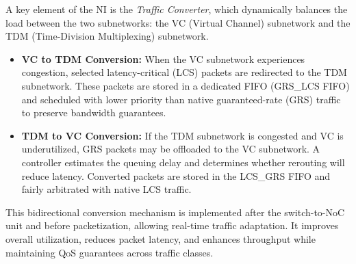 A key element of the NI is the \textit{Traffic Converter}, which dynamically balances the load between the two subnetworks: the VC (Virtual Channel) subnetwork and the TDM (Time-Division Multiplexing) subnetwork.
\begin{itemize}
    \item \textbf{VC to TDM Conversion:} When the VC subnetwork experiences congestion, selected latency-critical (LCS) packets are redirected to the TDM subnetwork. These packets are stored in a dedicated FIFO (GRS\_LCS FIFO) and scheduled with lower priority than native guaranteed-rate (GRS) traffic to preserve bandwidth guarantees.
    \item \textbf{TDM to VC Conversion:} If the TDM subnetwork is congested and VC is underutilized, GRS packets may be offloaded to the VC subnetwork. A controller estimates the queuing delay and determines whether rerouting will reduce latency. Converted packets are stored in the LCS\_GRS FIFO and fairly arbitrated with native LCS traffic.
\end{itemize}
This bidirectional conversion mechanism is implemented after the switch-to-NoC unit and before packetization, allowing real-time traffic adaptation. It improves overall utilization, reduces packet latency, and enhances throughput while maintaining QoS guarantees across traffic classes.


